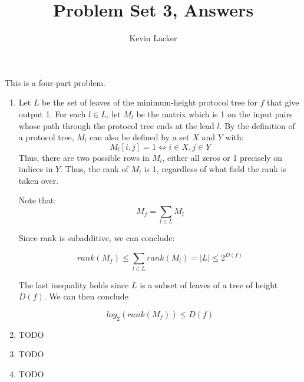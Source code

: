 \documentclass{article}
\newenvironment{problem}[2][Problem]{\begin{trivlist}
\item[\hskip \labelsep {\bfseries #1}\hskip \labelsep {\bfseries #2.}]}{\end{trivlist}}
\begin{document}
\title{Problem Set 3, Answers}
\author{Kevin Lacker}
\maketitle

\begin{problem}{1}
  This is a four-part problem.
  \begin{enumerate}
    \item Let $L$ be the set of leaves of the minimum-height protocol
      tree for $f$ that
      give output 1. For each $l \in L$, let $M_l$ be the matrix which
      is 1 on the input pairs whose path through the protocol tree
      ends at the lead $l$. By the definition of a protocol tree,
      $M_l$ can also be defined by a set $X$ and $Y$ with:
      \begin{equation}
        M_l[i,j] = 1 \iff i \in X, j \in Y
      \end{equation}
      Thus, there are two possible rows in
      $M_l$, either all zeros or 1 precisely on indices in $Y$. Thus,
      the rank of $M_l$ is 1, regardless of what field the rank is
      taken over.

      Note that:
      \begin{equation}
        M_f = \sum_{l \in L} M_l
      \end{equation}

      Since rank is subadditive, we can conclude:

      \begin{equation}
        rank(M_f) \leq \sum_{l \in L} rank(M_l) = |L| \leq 2^{D(f)}
      \end{equation}

      The last inequality holds since $L$ is a subset of leaves of a
      tree of height $D(f)$. We can then conclude

      \begin{equation}
        log_2(rank(M_f)) \leq D(f)
      \end{equation}
    \item TODO
    \item TODO
    \item TODO
  \end{enumerate}
\end{problem}
\end{document}
